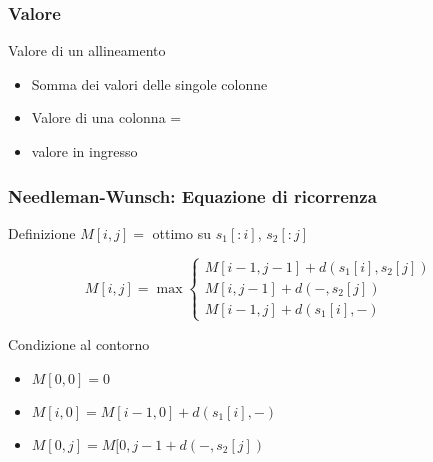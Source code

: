 \begin{frame}[fragile]
\frametitle{Valore}
\begin{block}{Valore di un allineamento}
\begin{itemize}[<+->]
\item
Somma dei valori delle singole colonne
\item
Valore di una colonna =
\item
valore in ingresso
\end{itemize}
\end{block}

\end{frame}

\begin{frame}[fragile]
\frametitle{Needleman-Wunsch: Equazione di ricorrenza}
\begin{block}{Definizione}
$M[i,j] = $ ottimo su $s_{1}[:i]$, $s_{2}[:j]$
\end{block}
\begin{equation*}
M[i,j] = \max \left\{
\begin{array}{r}%
M[i-1, j-1] + d(s_{1}[i], s_{2}[j])\\
M[i  , j-1] + d( -     , s_{2}[j])\\
M[i-1, j  ] + d(s_{1}[i], -      )
\end{array}
\right.
\end{equation*}
\begin{block}{Condizione al contorno}
\begin{itemize}
\item
$M[0,0] = 0$
\item
$M[i,0] = M[i-1,0] + d(s_{1}[i],-)$
\item
$M[0,j] = M[0,j-1 + d(-,s_{2}[j])$
\end{itemize}
\end{block}
\end{frame}


